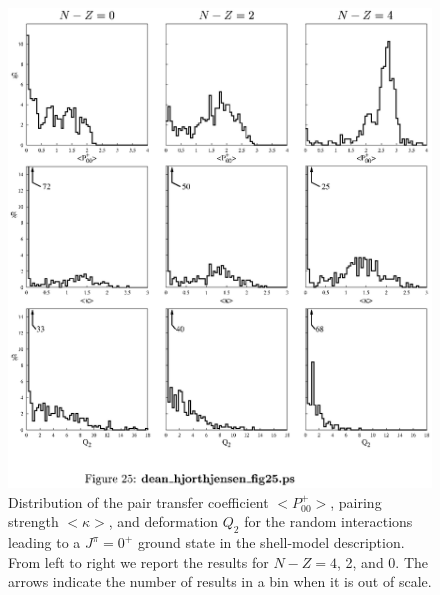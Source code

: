 \documentclass[rmp,aps,floatfix]{revtex4}
\begin{document}
\begin{figure}
\begin{center}
\includegraphics[scale=0.7,angle=0]{dean_hjorthjensen_fig25.ps}
\end{center}
\caption{Distribution of the pair transfer coefficient $<\!\!P^+_{00}\!\!>$,
pairing strength $<\!\!\kappa\!\!>$, and deformation $Q_2$ for the random 
interactions
leading to a $J^\pi=0^+$ ground state in the shell-model description.
From left to right we report the results for $N-Z=4$, 2, and 0. The arrows
indicate the number of results in a bin when it is out of scale.}
\label{kfig4}
\end{figure}
\end{document}

